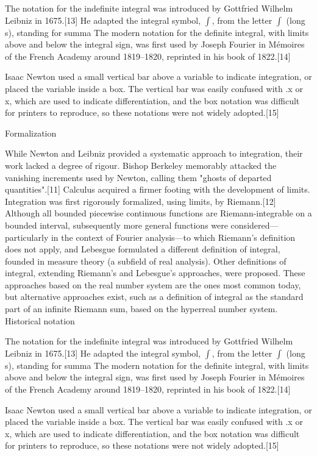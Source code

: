 \documentclass[twocolumn,a4paper,12pt]{article}
\begin{document}
The notation for the indefinite integral was introduced by Gottfried Wilhelm Leibniz in 1675.[13] He adapted the integral symbol, $\int$, from the letter $\int$ (long s), standing for summa  The modern notation for the definite integral, with limits above and below the integral sign, was first used by Joseph Fourier in Mémoires of the French Academy around 1819–1820, reprinted in his book of 1822.[14]

Isaac Newton used a small vertical bar above a variable to indicate integration, or placed the variable inside a box. The vertical bar was easily confused with .x or x, which are used to indicate differentiation, and the box notation was difficult for printers to reproduce, so these notations were not widely adopted.[15] 

Formalization

While Newton and Leibniz provided a systematic approach to integration, their work lacked a degree of rigour. Bishop Berkeley memorably attacked the vanishing increments used by Newton, calling them "ghosts of departed quantities".[11] Calculus acquired a firmer footing with the development of limits. Integration was first rigorously formalized, using limits, by Riemann.[12] Although all bounded piecewise continuous functions are Riemann-integrable on a bounded interval, subsequently more general functions were considered—particularly in the context of Fourier analysis—to which Riemann's definition does not apply, and Lebesgue formulated a different definition of integral, founded in measure theory (a subfield of real analysis). Other definitions of integral, extending Riemann's and Lebesgue's approaches, were proposed. These approaches based on the real number system are the ones most common today, but alternative approaches exist, such as a definition of integral as the standard part of an infinite Riemann sum, based on the hyperreal number system. 
Historical notation

The notation for the indefinite integral was introduced by Gottfried Wilhelm Leibniz in 1675.[13] He adapted the integral symbol, $\int$, from the letter $\int$ (long s), standing for summa  The modern notation for the definite integral, with limits above and below the integral sign, was first used by Joseph Fourier in Mémoires of the French Academy around 1819–1820, reprinted in his book of 1822.[14]

Isaac Newton used a small vertical bar above a variable to indicate integration, or placed the variable inside a box. The vertical bar was easily confused with .x or x, which are used to indicate differentiation, and the box notation was difficult for printers to reproduce, so these notations were not widely adopted.[15] 
\end{document}
